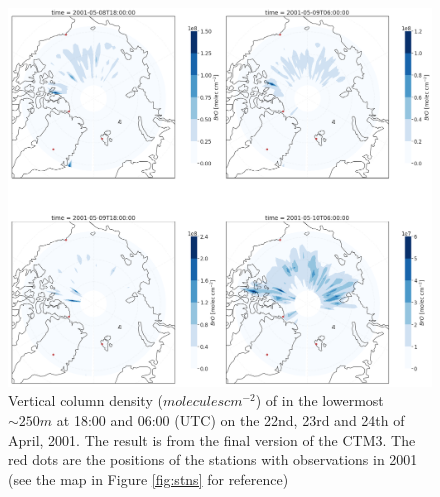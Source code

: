 \begin{figure}[h]
    \centering
    \includegraphics[width = \linewidth]{Chapter6_Results/images/Polar_StationComp_2001/BrO/polarBrO_step4.png}
    \caption{Vertical column density ($molecules cm^{-2}$) of  in the lowermost $\sim 250 m$ at 18:00 and 06:00 (UTC) on the 22nd, 23rd and 24th of April, 2001. The result is from the final version of the CTM3. The red dots are the positions of the stations with observations in 2001 (see the map in Figure \ref{fig:stns} for reference)}
    \label{fig:polarBrO_step4}
\end{figure}